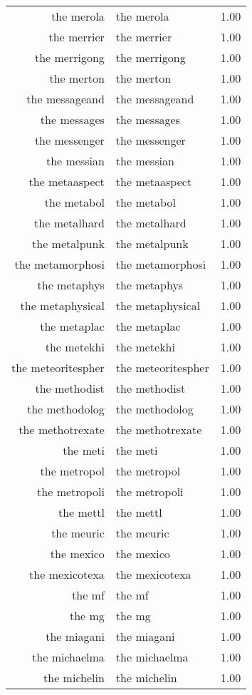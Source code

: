 \begin{table}[ht]
\begin{tabular}{rlr}
  the merola & the merola & 1.00 \\ 
  the merrier & the merrier & 1.00 \\ 
  the merrigong & the merrigong & 1.00 \\ 
  the merton & the merton & 1.00 \\ 
  the messageand & the messageand & 1.00 \\ 
  the messages & the messages & 1.00 \\ 
  the messenger & the messenger & 1.00 \\ 
  the messian & the messian & 1.00 \\ 
  the metaaspect & the metaaspect & 1.00 \\ 
  the metabol & the metabol & 1.00 \\ 
  the metalhard & the metalhard & 1.00 \\ 
  the metalpunk & the metalpunk & 1.00 \\ 
  the metamorphosi & the metamorphosi & 1.00 \\ 
  the metaphys & the metaphys & 1.00 \\ 
  the metaphysical & the metaphysical & 1.00 \\ 
  the metaplac & the metaplac & 1.00 \\ 
  the metekhi & the metekhi & 1.00 \\ 
  the meteoritespher & the meteoritespher & 1.00 \\ 
  the methodist & the methodist & 1.00 \\ 
  the methodolog & the methodolog & 1.00 \\ 
  the methotrexate & the methotrexate & 1.00 \\ 
  the meti & the meti & 1.00 \\ 
  the metropol & the metropol & 1.00 \\ 
  the metropoli & the metropoli & 1.00 \\ 
  the mettl & the mettl & 1.00 \\ 
  the meuric & the meuric & 1.00 \\ 
  the mexico & the mexico & 1.00 \\ 
  the mexicotexa & the mexicotexa & 1.00 \\ 
  the mf & the mf & 1.00 \\ 
  the mg & the mg & 1.00 \\ 
  the miagani & the miagani & 1.00 \\ 
  the michaelma & the michaelma & 1.00 \\ 
  the michelin & the michelin & 1.00 \\ 

\end{tabular}
\end{table}
